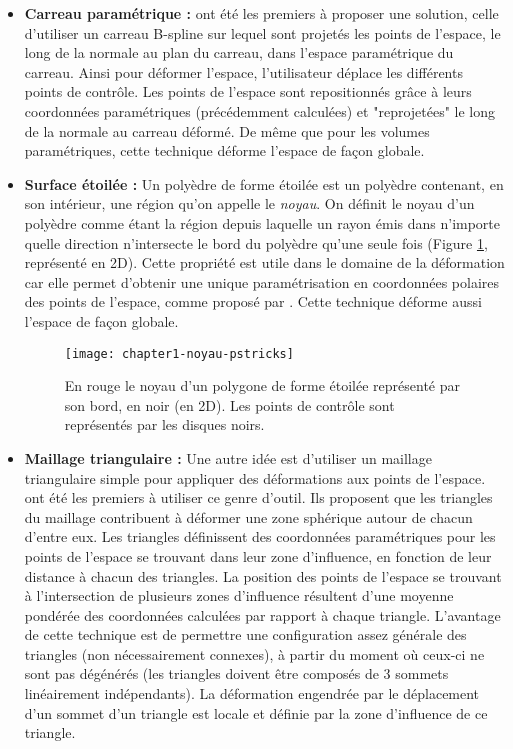 \begin{itemize}

\item{\textbf{Carreau paramétrique :}} \cite{JLQ96} ont été les premiers à
proposer une solution, celle d'utiliser un carreau B-spline sur lequel sont
projetés les points de l'espace, le long de la normale au plan du carreau,
dans l'espace paramétrique du carreau. Ainsi pour déformer l'espace,
l'utilisateur déplace les différents points de contrôle. Les points de
l'espace sont repositionnés grâce à leurs coordonnées paramétriques
(précédemment calculées) et "reprojetées" le long de la normale au carreau
déformé. De même que pour les volumes paramétriques, cette technique déforme
l'espace de façon globale.

\item{\textbf{Surface étoilée :}} Un polyèdre de forme étoilée est un polyèdre
contenant, en son intérieur, une région qu'on appelle le \textit{noyau}. On
définit le noyau d'un polyèdre comme étant la région depuis laquelle un rayon
émis dans n'importe quelle direction n'intersecte le bord du polyèdre qu'une
seule fois (Figure \ref{SUReto}, représenté en 2D). Cette propriété est utile
dans le domaine de la déformation car elle permet d'obtenir une unique
paramétrisation en coordonnées polaires des points de l'espace, comme proposé
par \cite{JL00}. Cette technique déforme aussi l'espace de façon globale.

 \begin{figure}[ht]
 \begin{center}
  \texttt{[image: chapter1-noyau-pstricks]}

  \caption[Noyau d'un polygone] {En rouge le noyau d'un polygone de forme
étoilée représenté par son bord, en noir (en 2D). Les points de contrôle sont
représentés par les disques noirs.}

  \label{SUReto}
 \end{center}
 \end{figure}

\item{\textbf{Maillage triangulaire :}} Une autre idée est d'utiliser un
maillage triangulaire simple pour appliquer des déformations aux points de
l'espace. \cite{KO03} ont été les premiers à utiliser ce genre d'outil. Ils
proposent que les triangles du maillage contribuent à déformer une zone
sphérique autour de chacun d'entre eux. Les triangles définissent des
coordonnées paramétriques pour les points de l'espace se trouvant dans leur
zone d'influence, en fonction de leur distance à chacun des triangles. La
position des points de l'espace se trouvant à l'intersection de plusieurs
zones d'influence résultent d'une moyenne pondérée des coordonnées calculées
par rapport à chaque triangle. L'avantage de cette technique est de permettre
une configuration assez générale des triangles (non nécessairement connexes),
à partir du moment où ceux-ci ne sont pas dégénérés (les triangles doivent
être composés de 3 sommets linéairement indépendants). La déformation
engendrée par le déplacement d'un sommet d'un triangle est locale et définie
par la zone d'influence de ce triangle.


\end{itemize}
